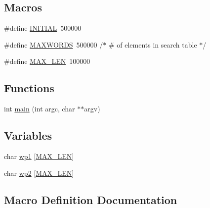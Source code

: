 \subsection*{Macros}
\begin{DoxyCompactItemize}
\item 
\#define \mbox{\hyperlink{adat-devel_2other__libs_2filedb_2filehash_2tread_8c_aa3d063564f6ab16f6d408b8369d0e9ff}{I\+N\+I\+T\+I\+AL}}~500000
\item 
\#define \mbox{\hyperlink{adat-devel_2other__libs_2filedb_2filehash_2tread_8c_aa6b319146daf33409da1bbe4194553dc}{M\+A\+X\+W\+O\+R\+DS}}~500000	       /$\ast$ \# of elements in search table $\ast$/
\item 
\#define \mbox{\hyperlink{adat-devel_2other__libs_2filedb_2filehash_2tread_8c_aabf4f709c8199e41cf279c77112345fe}{M\+A\+X\+\_\+\+L\+EN}}~100000
\end{DoxyCompactItemize}
\subsection*{Functions}
\begin{DoxyCompactItemize}
\item 
int \mbox{\hyperlink{adat-devel_2other__libs_2filedb_2filehash_2tread_8c_a3c04138a5bfe5d72780bb7e82a18e627}{main}} (int argc, char $\ast$$\ast$argv)
\end{DoxyCompactItemize}
\subsection*{Variables}
\begin{DoxyCompactItemize}
\item 
char \mbox{\hyperlink{adat-devel_2other__libs_2filedb_2filehash_2tread_8c_ae2b9e201e27e242b57e2ff99dff6d28a}{wp1}} \mbox{[}\mbox{\hyperlink{adat__devel_2other__libs_2filedb_2filehash_2twrite_8c_aabf4f709c8199e41cf279c77112345fe}{M\+A\+X\+\_\+\+L\+EN}}\mbox{]}
\item 
char \mbox{\hyperlink{adat-devel_2other__libs_2filedb_2filehash_2tread_8c_a54ed4cc0c9df4a27e6b33a32e3c785cc}{wp2}} \mbox{[}\mbox{\hyperlink{adat__devel_2other__libs_2filedb_2filehash_2twrite_8c_aabf4f709c8199e41cf279c77112345fe}{M\+A\+X\+\_\+\+L\+EN}}\mbox{]}
\end{DoxyCompactItemize}


\subsection{Macro Definition Documentation}
\mbox{\label{adat-devel_2other__libs_2filedb_2filehash_2tread_8c_aa3d063564f6ab16f6d408b8369d0e9ff}} 
